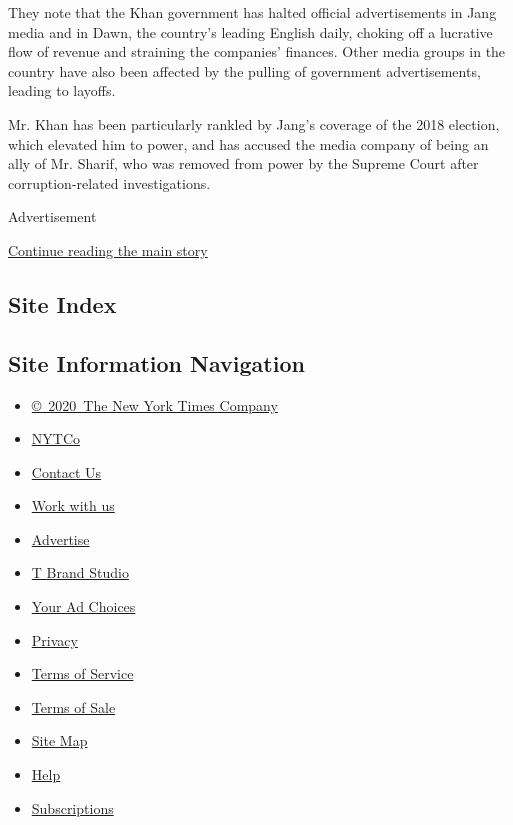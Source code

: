 They note that the Khan government has halted official advertisements in
Jang media and in Dawn, the country's leading English daily, choking off
a lucrative flow of revenue and straining the companies' finances. Other
media groups in the country have also been affected by the pulling of
government advertisements, leading to layoffs.

Mr. Khan has been particularly rankled by Jang's coverage of the 2018
election, which elevated him to power, and has accused the media company
of being an ally of Mr. Sharif, who was removed from power by the
Supreme Court after corruption-related investigations.

Advertisement

\protect\hyperlink{after-bottom}{Continue reading the main story}

\hypertarget{site-index}{%
\subsection{Site Index}\label{site-index}}

\hypertarget{site-information-navigation}{%
\subsection{Site Information
Navigation}\label{site-information-navigation}}

\begin{itemize}
\tightlist
\item
  \href{https://help.nytimes.com/hc/en-us/articles/115014792127-Copyright-notice}{©~2020~The
  New York Times Company}
\end{itemize}

\begin{itemize}
\tightlist
\item
  \href{https://www.nytco.com/}{NYTCo}
\item
  \href{https://help.nytimes.com/hc/en-us/articles/115015385887-Contact-Us}{Contact
  Us}
\item
  \href{https://www.nytco.com/careers/}{Work with us}
\item
  \href{https://nytmediakit.com/}{Advertise}
\item
  \href{http://www.tbrandstudio.com/}{T Brand Studio}
\item
  \href{https://www.nytimes.com/privacy/cookie-policy\#how-do-i-manage-trackers}{Your
  Ad Choices}
\item
  \href{https://www.nytimes.com/privacy}{Privacy}
\item
  \href{https://help.nytimes.com/hc/en-us/articles/115014893428-Terms-of-service}{Terms
  of Service}
\item
  \href{https://help.nytimes.com/hc/en-us/articles/115014893968-Terms-of-sale}{Terms
  of Sale}
\item
  \href{https://spiderbites.nytimes.com}{Site Map}
\item
  \href{https://help.nytimes.com/hc/en-us}{Help}
\item
  \href{https://www.nytimes.com/subscription?campaignId=37WXW}{Subscriptions}
\end{itemize}
